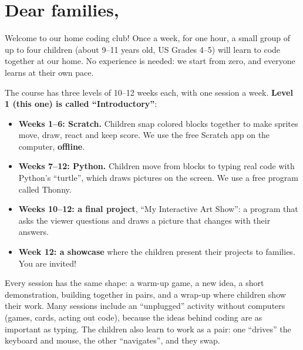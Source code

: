 \documentclass[level=1]{kidscode}
\begin{document}

\section{Dear families,}
Welcome to our home coding club! Once a week, for one hour, a small group of up to four children
(about 9--11 years old, US Grades 4--5) will learn to code together at our home. No experience is needed: we start
from zero, and everyone learns at their own pace.

The course has three levels of 10--12 weeks each, with one session a week. \textbf{Level 1 (this one) is called
\enquote{Introductory}}:
\begin{itemize}[itemsep=2pt]
  \item \textbf{Weeks 1--6: Scratch.} Children snap colored blocks together to make sprites move, draw,
        react and keep score. We use the free Scratch app on the computer, \textbf{offline}.
  \item \textbf{Weeks 7--12: Python.} Children move from blocks to typing real code with Python's
        \enquote{turtle}, which draws pictures on the screen. We use a free program called Thonny.
  \item \textbf{Weeks 10--12: a final project}, \enquote{My Interactive Art Show}: a program that asks
        the viewer questions and draws a picture that changes with their answers.
  \item \textbf{Week 12: a showcase} where the children present their projects to families. You are invited!
\end{itemize}
Every session has the same shape: a warm-up game, a new idea, a short demonstration, building
together in pairs, and a wrap-up where children show their work. Many sessions include an
\enquote{unplugged} activity without computers (games, cards, acting out code), because the ideas
behind coding are as important as typing. The children also learn to work as a pair: one
\enquote{drives} the keyboard and mouse, the other \enquote{navigates}, and they swap.
\end{document}
